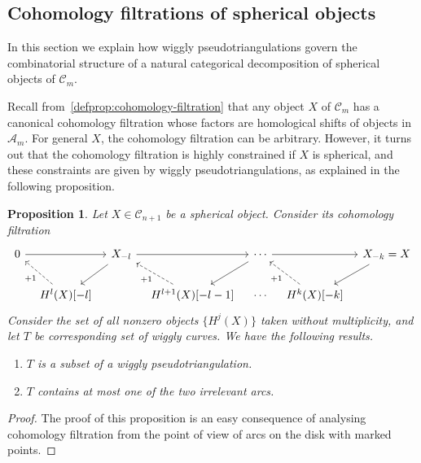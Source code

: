 \documentclass{amsart}
\newtheorem{proposition}[theorem]{Proposition}
\theoremstyle{definition}
\newcommand{\asilata}[2][]{\todo[size=\scriptsize, color=orange!30,#1]{\rm #2 \\ \hfill --- A.}}
\begin{document}
\subsection{Cohomology filtrations of spherical objects}
In this section we explain how wiggly pseudotriangulations govern the combinatorial structure of a natural categorical decomposition of spherical objects of \(\mathcal{C}_m\).

Recall from~\cref{defprop:cohomology-filtration} that any object \(X\) of \(\mathcal{C}_m\) has a canonical cohomology filtration whose factors are homological shifts of objects in \(\mathcal{A}_m\).
For general \(X\), the cohomology filtration can be arbitrary.
However, it turns out that the cohomology filtration is highly constrained if \(X\) is spherical, and these constraints are given by wiggly pseudotriangulations, as explained in the following proposition.
\begin{proposition}\label{prop:hn-filtration}
  Let \(X \in \mathcal{C}_{n+1}\) be a spherical object.
  Consider its cohomology filtration
  \[
    \begin{tikzcd}[column sep=0.3cm]
      0 \arrow{rr} && X_{-l} \arrow{dl} \arrow{rr} && \cdots \arrow{rr} \arrow{dl} && X_{-k} = X \arrow{dl}\\
      & H^l(X)[-l] \arrow[dashed]{ul}{+1} && H^{l+1}(X)[-l-1] \arrow[dashed]{ul}{+1} & \cdots & H^k(X)[-k] \arrow[dashed]{ul}{+1}
    \end{tikzcd}
  \]
  Consider the set of all nonzero objects \(\{H^j(X)\}\) taken without multiplicity, and let \(T\) be corresponding set of wiggly curves.
  We have the following results.
  \begin{enumerate}
  \item 
    \(T\) is a subset of a wiggly pseudotriangulation.
  \item \(T\) contains at most one of the two irrelevant arcs.
  \end{enumerate}
\end{proposition}
\begin{proof}
  The proof of this proposition is an easy consequence of analysing cohomology filtration from the point of view of arcs on the disk with marked points.
  \asilata{TODO.}
\end{proof}
\end{document}
